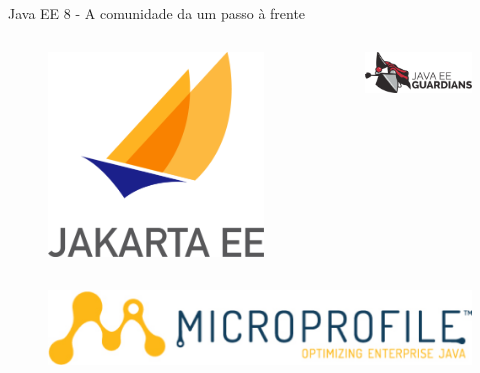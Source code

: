 \documentclass{beamer}
\begin{document}
\begin{frame}{Java EE 8 - A comunidade da um passo à frente}
\begin{columns}
\begin{column}{0.5\textwidth}
	\begin{figure}
		\centering
		\includegraphics[width=0.7\linewidth]{Images/jakartaee}
	\end{figure}
	\end{column}
	\begin{column}{0.5\textwidth}  %
		\begin{figure}
			\centering
			\includegraphics[width=\linewidth]{Images/guardians}
		\end{figure}
	\end{column}
\end{columns}

\begin{figure}
	\centering
	\includegraphics[width=0.7\linewidth]{Images/microprofile-logo}
\end{figure}
\end{frame}
\end{document}

